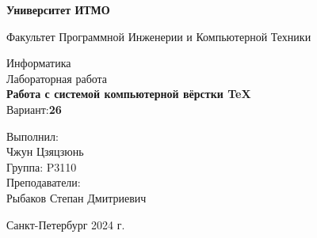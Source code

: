 \begin{titlepage}
    \thispagestyle{empty}
    \begin{center}
        \textbf{Университет ИТМО}
    
        \vspace{1em}
        Факультет Программной Инженерии и Компьютерной Техники
        \vspace{20em}
    
        {\Large Информатика}\\[1em]
        {\Large Лабораторная работа }\\[1em]
        {\Large \textbf{Работа с системой компьютерной вёрстки \TeX}}\\[1em]
        Вариант:\textbf{26}
    \end{center}
    
    \vspace{14em}
    
    \begin{flushright}
        Выполнил:\\
        Чжун Цзяцзюнь\\
        Группа: P3110\\
        Преподаватели:\\
        Рыбаков Степан Дмитриевич\\
    \end{flushright}
    
    \vspace{9em}
    \vspace{\fill}
    
    \begin{center}
        Санкт-Петербург 2024 г.
    \end{center}
    
    \end{titlepage}